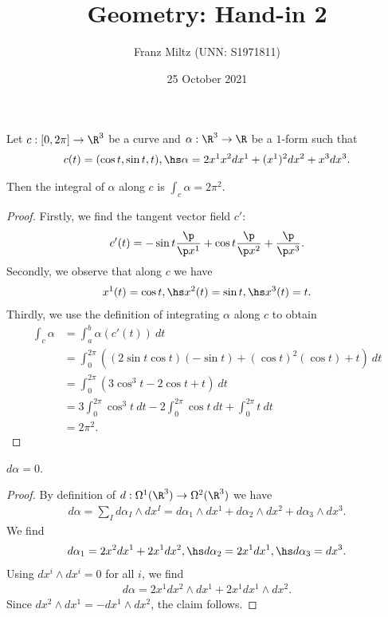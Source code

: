 \documentclass{article}
\begin{document}
\title{Geometry: Hand-in 2}
\author{Franz Miltz (UNN: S1971811)}
\date{25 October 2021}
\maketitle
\noindent Let $c:[0,2\pi] \to \R^3$ be a curve and $\alpha:\R^3\to\R$ be a $1$-form
such that
\begin{align*}
   c(t)   = (\cos t, \sin t, t), \hs
   \alpha = 2x^1x^2dx^1 + (x^1)^2dx^2 + x^3dx^3.
\end{align*}

\begin{claim*}
   Then the integral of $\alpha$ along $c$ is $\int_c \alpha = 2\pi^2$.
\end{claim*}
\begin{proof}
   Firstly, we find the tangent vector field $c'$:
   \begin{align*}
      c'(t) = -\sin t\frac{\p }{\p x^1} + \cos t\frac{\p }{\p x^2} + \frac{\p }{\p x^3} .
   \end{align*}
   Secondly, we observe that along $c$ we have
   \begin{align*}
      x^1(t) = \cos t, \hs x^2(t)= \sin t, \hs x^3(t) = t.
   \end{align*}
   Thirdly, we use the definition of integrating $\alpha$ along $c$ to obtain
   \begin{align*}
      \int_c \alpha & = \int_a^b \alpha(c'(t))\:dt                                                        \\
                    & = \int_0^{2\pi}\left( (2\sin t\cos t)(-\sin t) + (\cos t)^2 (\cos t) + t\right)\:dt \\
                    & = \int_0^{2\pi} \left(3\cos^3 t - 2 \cos t + t\right)\:dt                           \\
                    & = 3\int_0^{2\pi} \cos^3 t\:dt - 2 \int_0^{2\pi} \cos t\: dt + \int_0^{2\pi} t\:dt   \\
                    & = 2\pi^2.
   \end{align*}
\end{proof}

\begin{claim*}
   $d\alpha = 0$.
\end{claim*}
\begin{proof}
   By definition of $d:\Omega^1(\R^3) \to\Omega^2(\R^3)$ we have
   \begin{align*}
      d\alpha =\sum_I d\alpha_I\wedge dx^I
      = d\alpha_1\wedge dx^1 + d\alpha_2\wedge dx^2 + d\alpha_3\wedge dx^3.
   \end{align*}
   We find
   \begin{align*}
      d\alpha_1 = 2x^2dx^1 + 2x^1dx^2, \hs
      d\alpha_2 = 2x^1dx^1, \hs
      d\alpha_3 = dx^3.
   \end{align*}
   Using $dx^i\wedge dx^i=0$ for all $i$, we find
   \begin{align*}
      d\alpha = 2x^1dx^2\wedge dx^1 + 2x^1dx^1\wedge dx^2.
   \end{align*}
   Since $dx^2\wedge dx^1=-dx^1\wedge dx^2$, the claim follows.
\end{proof}
\end{document}
